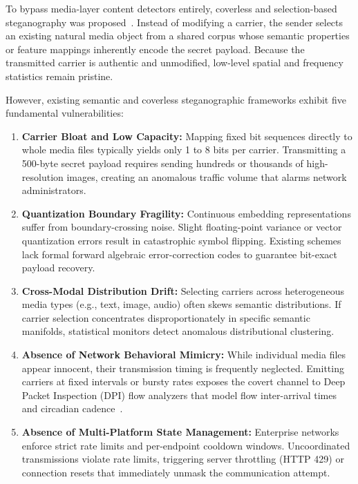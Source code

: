 \documentclass[conference]{IEEEtran}
\begin{document}
To bypass media-layer content detectors entirely, coverless and selection-based steganography was proposed~\cite{zhou2015novel,zhang2018coverless}. Instead of modifying a carrier, the sender selects an existing natural media object from a shared corpus whose semantic properties or feature mappings inherently encode the secret payload. Because the transmitted carrier is authentic and unmodified, low-level spatial and frequency statistics remain pristine.

However, existing semantic and coverless steganographic frameworks exhibit five fundamental vulnerabilities:
\begin{enumerate}
    \item \textbf{Carrier Bloat and Low Capacity:} Mapping fixed bit sequences directly to whole media files typically yields only 1 to 8 bits per carrier. Transmitting a 500-byte secret payload requires sending hundreds or thousands of high-resolution images, creating an anomalous traffic volume that alarms network administrators.
    \item \textbf{Quantization Boundary Fragility:} Continuous embedding representations suffer from boundary-crossing noise. Slight floating-point variance or vector quantization errors result in catastrophic symbol flipping. Existing schemes lack formal forward algebraic error-correction codes to guarantee bit-exact payload recovery.
    \item \textbf{Cross-Modal Distribution Drift:} Selecting carriers across heterogeneous media types (e.g., text, image, audio) often skews semantic distributions. If carrier selection concentrates disproportionately in specific semantic manifolds, statistical monitors detect anomalous distributional clustering.
    \item \textbf{Absence of Network Behavioral Mimicry:} While individual media files appear innocent, their transmission timing is frequently neglected. Emitting carriers at fixed intervals or bursty rates exposes the covert channel to Deep Packet Inspection (DPI) flow analyzers that model flow inter-arrival times and circadian cadence~\cite{wright2006inferring,dyer2012peekaboo}.
    \item \textbf{Absence of Multi-Platform State Management:} Enterprise networks enforce strict rate limits and per-endpoint cooldown windows. Uncoordinated transmissions violate rate limits, triggering server throttling (HTTP 429) or connection resets that immediately unmask the communication attempt.
\end{enumerate}
\end{document}
